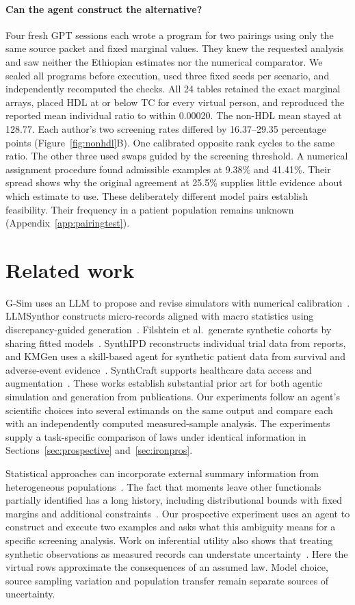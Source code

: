 \documentclass[sigconf,anonymous,review]{acmart}
\begin{document}
\paragraph{Can the agent construct the alternative?}
Four fresh GPT sessions each wrote a program for two pairings using only the same source packet and fixed marginal values. They knew the requested analysis and saw neither the Ethiopian estimates nor the numerical comparator. We sealed all programs before execution, used three fixed seeds per scenario, and independently recomputed the checks. All 24 tables retained the exact marginal arrays, placed HDL at or below TC for every virtual person, and reproduced the reported mean individual ratio to within 0.00020. The non-HDL mean stayed at 128.77. Each author's two screening rates differed by 16.37--29.35 percentage points (Figure~\ref{fig:nonhdl}B). One calibrated opposite rank cycles to the same ratio. The other three used swaps guided by the screening threshold. A numerical assignment procedure found admissible examples at 9.38\% and 41.41\%. Their spread shows why the original agreement at 25.5\% supplies little evidence about which estimate to use. These deliberately different model pairs establish feasibility. Their frequency in a patient population remains unknown (Appendix~\ref{app:pairingtest}).

\section{Related work}
G-Sim uses an LLM to propose and revise simulators with numerical calibration~\cite{gsim}. LLMSynthor constructs micro-records aligned with macro statistics using discrepancy-guided generation~\cite{llmsynthor}. Filshtein et al.\ generate synthetic cohorts by sharing fitted models~\cite{filshtein}. SynthIPD reconstructs individual trial data from reports, and KMGen uses a skill-based agent for synthetic patient data from survival and adverse-event evidence~\cite{synthipd,kmgen}. SynthCraft supports healthcare data access and augmentation~\cite{synthcraft}. These works establish substantial prior art for both agentic simulation and generation from publications. Our experiments follow an agent's scientific choices into several estimands on the same output and compare each with an independently computed measured-sample analysis. The experiments supply a task-specific comparison of laws under identical information in Sections~\ref{sec:prospective} and~\ref{sec:ironpros}.

Statistical approaches can incorporate external summary information from heterogeneous populations~\cite{syndi}. The fact that moments leave other functionals partially identified has a long history, including distributional bounds with fixed margins and additional constraints~\cite{bounds,makarov,zaev}. Our prospective experiment uses an agent to construct and execute two examples and asks what this ambiguity means for a specific screening analysis. Work on inferential utility also shows that treating synthetic observations as measured records can understate uncertainty~\cite{inferential}. Here the virtual rows approximate the consequences of an assumed law. Model choice, source sampling variation and population transfer remain separate sources of uncertainty.
\end{document}
